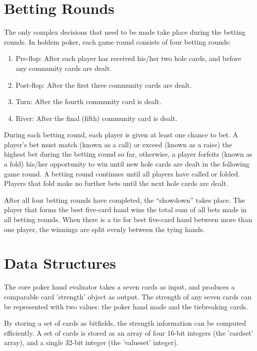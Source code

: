 \section{Betting Rounds}
\label{sec:BettingRounds}

The only complex decisions that need to be made take place during the betting rounds.
In holdem poker, each game round consists of four betting rounds:
\begin{enumerate}
\singlespacing
\item Pre-flop: After each player has received his/her two hole cards, and before any community cards are dealt.
\item Post-flop: After the first three community cards are dealt.
\item Turn: After the fourth community card is dealt.
\item River: After the final (fifth) community card is dealt.
\end{enumerate}

During each betting round, each player is given at least one chance to bet.
A player's bet must match (known as a call) or exceed (known as a raise) the highest bet during the betting round so far, otherwise, a player forfeits (known as a fold) his/her opportunity to win until new hole cards are dealt in the following game round.
A betting round continues until all players have called or folded.
Players that fold make no further bets until the next hole cards are dealt.

After all four betting rounds have completed, the ``showdown'' takes place.
The player that forms the best five-card hand wins the total sum of all bets made in all betting rounds.
When there is a tie for best five-card hand between more than one player, the winnings are split evenly between the tying hands.



\section{Data Structures}
\label{sec:DataStructures}

The core poker hand evaluator takes a seven cards as input, and produces a comparable card 'strength' object as output.
The strength of any seven cards can be represented with two values: the poker hand made and the tiebreaking cards.

By storing a set of cards as bitfields, the strength information can be computed efficiently.
A set of cards is stored as an array of four 16-bit integers (the 'cardset' array), and a single 32-bit integer (the 'valueset' integer).

